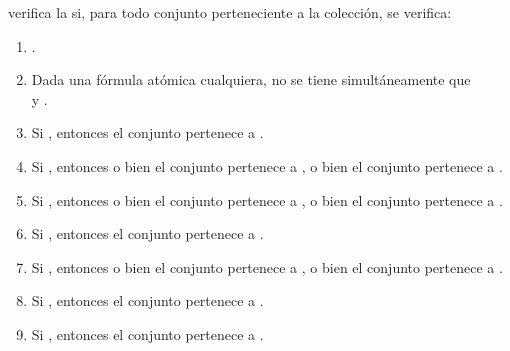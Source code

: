 \begin{isabellebody}
\begin{isamarkuptext}
\begin{definicion}
     verifica la  si, para todo
    conjunto  perteneciente a la colección, se verifica:
    \begin{enumerate}
      \item {}.
      \item Dada  una fórmula atómica cualquiera, no se tiene 
        simultáneamente que\\  y .
      \item Si , entonces el conjunto  pertenece a .
      \item Si , entonces o bien el conjunto  pertenece a , o bien el 
        conjunto  pertenece a .
      \item Si , entonces o bien el conjunto  pertenece a , o bien el 
        conjunto  pertenece a .
      \item Si , entonces el conjunto  pertenece a .
      \item Si , entonces o bien el conjunto  pertenece a , o bien el 
        conjunto  pertenece a .
      \item Si , entonces el conjunto  pertenece a .
      \item Si , entonces el conjunto  pertenece a .
    \end{enumerate}
  \end{definicion}


\end{isamarkuptext}
\end{isabellebody}

